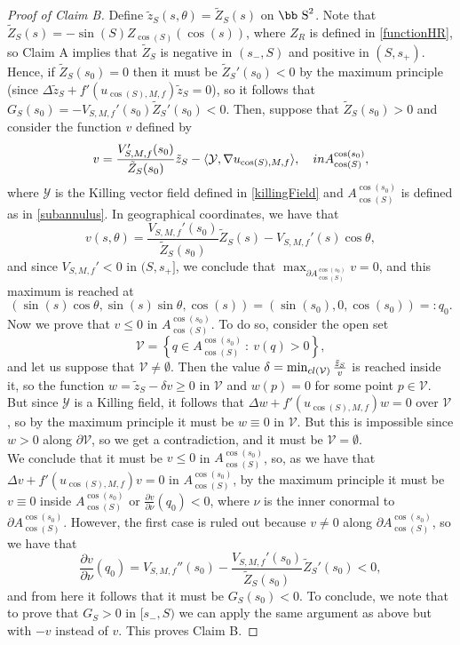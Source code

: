 \documentclass[11pt]{article}
\def\s{\hbox{\bb S}}
\newcommand{\set}[1]{\left\{#1\right\}}
\newcommand{\meta}[2]{\langle #1,#2 \rangle }
\numberwithin{equation} {section}
\begin{document}
\begin{proof}[Proof of Claim B]
Define $\tilde{z}_S (s,\theta) = \tilde{Z}_S (s)$ on $\s^2$. Note that $\tilde{Z}_S (s) = -\sin (S) Z_{\cos (S)} (\cos (s))$, where $Z_R$ is defined in \eqref{functionHR}, so Claim A implies that $\tilde{Z}_S$ is negative in $(s_- , S)$ and positive in $(S, s_+)$. Hence, if $\tilde{Z}_S (s_0)=0$ then it must be $\tilde{Z}_S ' (s_0)<0$ by the maximum principle (since $\Delta \tilde{z}_S + f' (u_{\cos (S),M,f}) \tilde{z}_S =0$), so it follows that $G_S (s_0)=-V_{S,M,f}' (s_0) \tilde{Z}_S ' (s_0)<0$. Then, suppose that $\tilde{Z}_S (s_0)>0$ and consider the function $v$ defined by
	\[
	v=\frac{V_{S,M,f}' (s_0)}{\tilde{Z}_S (s_0)} \tilde{z}_{S} - \meta{\mathcal{Y}}{\nabla u_{\cos (S),M,f}}, \quad \textup{in } A_{\cos (S)}^{\cos (s_0)},
	\]
	where $\mathcal{Y}$ is the Killing vector field defined in \eqref{killingField} and $A_{\cos (S)}^{\cos (s_0)}$ is defined as in \eqref{subannulus}. In geographical coordinates, we have that 
	\[
	v(s,\theta)= \frac{V_{S,M,f}' (s_0)}{\tilde{Z}_S (s_0)} \tilde{Z}_{S}(s)-V_{S,M,f} ' (s) \cos \theta,
	\]
	and since $V_{S,M,f}' <0$ in $(S,s_+]$, we conclude that $\max_{\partial A_{\cos (S)}^{\cos (s_0)}} v = 0$, and this maximum is reached at 
	\[
	(\sin (s) \cos \theta , \sin (s) \sin \theta ,\cos (s))=\left(\sin (s_0) , 0 , \cos (s_0) \right)=: q_0. 
	\]
	Now we prove that $v \leq 0$ in $A_{\cos (S)}^{\cos (s_0)}$. To do so, consider the open set $$\mathcal{V}= \set{q \in A_{\cos (S)}^{\cos (s_0)} ~\colon~v(q)>0},$$ and let us suppose that $\mathcal{V} \neq \emptyset$. Then the value $\delta=\min_{\textup{cl}(\mathcal{V})} \frac{\tilde{z}_S}{v}$ is reached inside it, so the function $w=\tilde{z}_S-\delta v \geq 0$ in $\mathcal{V}$ and $w(p)=0$ for some point $p \in \mathcal{V}$. But since $\mathcal{Y}$ is a Killing field, it follows that $\Delta w + f'(u_{\cos (S),M,f}) w=0$ over $\mathcal{V}$, so by the maximum principle it must be $w \equiv 0$ in $\mathcal{V}$. But this is impossible since $w >0$ along $\partial \mathcal{V}$, so we get a contradiction, and it must be $\mathcal{V} = \emptyset$.\\
	We conclude that it must be $v \leq 0$ in $A_{\cos (S)}^{\cos (s_0)}$, so, as we have that $\Delta v + f' (u_{\cos (S),M,f}) v =0$ in $A_{\cos (S)}^{\cos (s_0)}$, by the maximum principle it must be $v \equiv 0$ inside $A_{\cos (S)}^{\cos (s_0)}$ or $\frac{\partial v}{\partial \nu} (q_0) <0$, where $\nu$ is the inner conormal to $\partial A_{\cos (S)}^{\cos (s_0)}$. However, the first case is ruled out because $v \neq 0$ along $\partial A_{\cos (S)}^{\cos (s_0)}$, so we have that
	\[
	\frac{\partial v}{\partial \nu} (q_0) = V_{S,M,f}'' (s_0)-\frac{V_{S,M,f} ' (s_0)}{\tilde{Z}_S (s_0)} \tilde{Z}_S ' (s_0) <0,
	\]
	and from here it follows that it must be $G_S (s_0) <0$. To conclude, we note that to prove that $G_S>0$ in $[s_-,S)$ we can apply the same argument as above but with $-v$ instead of $v$. This proves Claim B.
\end{proof}
\end{document}
